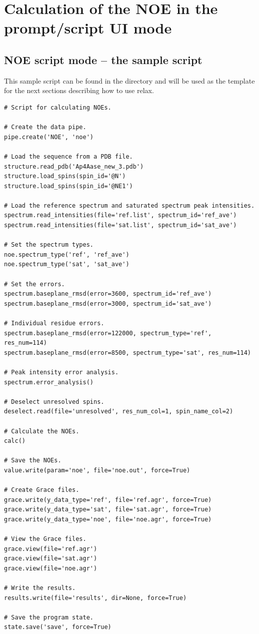 
\section{Calculation of the NOE in the prompt/script UI mode}



\subsection{NOE script mode -- the sample script}

This sample script can be found in the  directory and will be used as the template for the next sections describing how to use relax.

\begin{lstlisting}
# Script for calculating NOEs.

# Create the data pipe.
pipe.create('NOE', 'noe')

# Load the sequence from a PDB file.
structure.read_pdb('Ap4Aase_new_3.pdb')
structure.load_spins(spin_id='@N')
structure.load_spins(spin_id='@NE1')

# Load the reference spectrum and saturated spectrum peak intensities.
spectrum.read_intensities(file='ref.list', spectrum_id='ref_ave')
spectrum.read_intensities(file='sat.list', spectrum_id='sat_ave')

# Set the spectrum types.
noe.spectrum_type('ref', 'ref_ave')
noe.spectrum_type('sat', 'sat_ave')

# Set the errors.
spectrum.baseplane_rmsd(error=3600, spectrum_id='ref_ave')
spectrum.baseplane_rmsd(error=3000, spectrum_id='sat_ave')

# Individual residue errors.
spectrum.baseplane_rmsd(error=122000, spectrum_type='ref', res_num=114)
spectrum.baseplane_rmsd(error=8500, spectrum_type='sat', res_num=114)

# Peak intensity error analysis.
spectrum.error_analysis()

# Deselect unresolved spins.
deselect.read(file='unresolved', res_num_col=1, spin_name_col=2)

# Calculate the NOEs.
calc()

# Save the NOEs.
value.write(param='noe', file='noe.out', force=True)

# Create Grace files.
grace.write(y_data_type='ref', file='ref.agr', force=True)
grace.write(y_data_type='sat', file='sat.agr', force=True)
grace.write(y_data_type='noe', file='noe.agr', force=True)

# View the Grace files.
grace.view(file='ref.agr')
grace.view(file='sat.agr')
grace.view(file='noe.agr')

# Write the results.
results.write(file='results', dir=None, force=True)

# Save the program state.
state.save('save', force=True)
\end{lstlisting}



